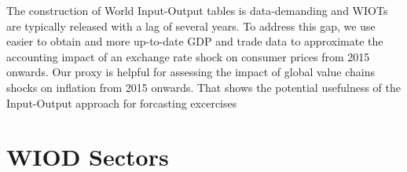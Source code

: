 \documentclass[11pt,a4paper]{article}
\begin{document}
The construction of World Input-Output tables is data-demanding and WIOTs are typically released with a lag of several years.
To address this gap, we use easier to obtain and more up-to-date GDP and trade data to approximate the accounting impact of an exchange rate shock on consumer prices from 2015 onwards. 
Our proxy is helpful for assessing the impact of global value chains shocks on inflation from 2015 onwards.
That shows the potential usefulness of the Input-Output approach for forcasting excercises



\newpage


\newpage
\appendix
\section{WIOD Sectors}
\end{document}
